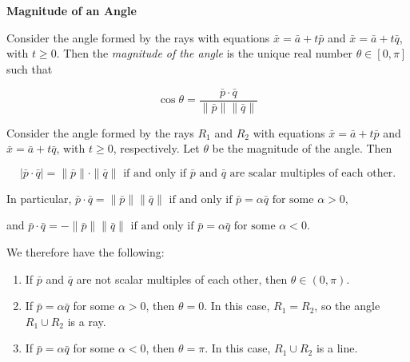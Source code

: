 \begin{definitionbox}
\textbf{Magnitude of an Angle}

Consider the angle formed by the rays with equations \(\bar{x} = \bar{a} + t\bar{p}\) and \(\bar{x} = \bar{a} + t\bar{q}\), with \(t \geq 0\).
Then the \textit{magnitude of the angle} is the unique real number \(\theta \in [0,\pi]\) such that

\[
    \cos \theta = \frac{\bar{p}\cdot \bar{q}}{\|\bar{p}\| \|\bar{q}\|}
\]
\end{definitionbox}

\begin{remarkbox}
    Consider the angle formed by the rays \(R_1\) and \(R_2\) with equations \(\bar{x} = \bar{a} + t\bar{p}\) and \(\bar{x} = \bar{a} + t\bar{q}\), with \(t \geq 0\), respectively.
    Let \(\theta\) be the magnitude of the angle. Then

    \[
        |\bar{p}\cdot\bar{q}| = \| \bar{p}\|\cdot \| \bar{q}\| \text{ if and only if } \bar{p} \text{ and } \bar{q} \text{ are scalar multiples of each other.}
    \]

    In particular, 
    \(
        \bar{p}\cdot\bar{q} = \| \bar{p}\|\| \bar{q}\| \text{ if and only if } \bar{p} = \alpha\bar{q} \text{ for some } \alpha > 0,
    \)

    and 
    \(
        \bar{p}\cdot\bar{q} = -\| \bar{p}\|\| \bar{q}\| \text{ if and only if } \bar{p} = \alpha\bar{q} \text{ for some } \alpha < 0.
    \)

    We therefore have the following:
    \begin{enumerate}
        \item If \(\bar{p}\) and \(\bar{q}\) are not scalar multiples of each other, then \(\theta \in (0,\pi)\).
        \item If \(\bar{p} = \alpha\bar{q}\) for some \(\alpha > 0\), then \(\theta = 0\). In this case, \(R_1=R_2\), so the angle \(R_1 \cup R_2\) is a ray.
        \item If \(\bar{p} = \alpha\bar{q}\) for some \(\alpha < 0\), then \(\theta = \pi\). In this case, \(R_1 \cup R_2\) is a line.
    \end{enumerate}

\end{remarkbox}

